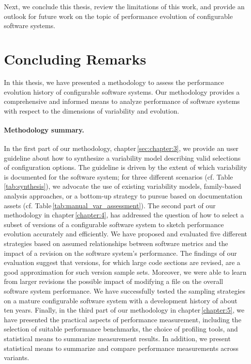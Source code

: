 Next, we conclude this thesis, review the limitations of this work, and provide
an outlook for future work on the topic of performance evolution of configurable
software systems.

\section{Concluding Remarks}
In this thesis, we have presented a methodology to assess the performance
evolution history of configurable software systems. Our methodology provides a
comprehensive and informed means to analyze performance of software systems
with respect to the dimensions of variability and evolution.

\paragraph{Methodology summary.} In the first part of our methodology,
chapter\,\ref{sec:chapter:3}, we provide an user guideline about how to
synthesize a variability model describing valid selections of configuration options. The guideline is driven by the extent of which variability is documented for the software system; for three different
scenarios (cf. Table\,\ref{tab:synthesis}), we advocate the use of existing
variability models, family-based analysis approaches, or a bottom-up strategy to pursue based on
documentation assets (cf. Table\,\ref{tab:manual_var_assessment}). 
The second part of our methodology in chapter\,\ref{chapter:4}, has
addressed the question of how to select a subset of versions of a configurable
software system to sketch performance evolution accurately and efficiently. We
have proposed and evaluated five different strategies based on assumed
relationships between software metrics and the impact of a revision on the
software system’s performance. The findings of our evaluation suggest that
versions, for which large code sections are revised, are a good approximation
for such version sample sets. Moreover, we were able to learn from larger revisions
the possible impact of modifying a file on the overall software system
performance. We have successfully tested the sampling strategies on a mature
configurable software system with a development history of about ten years.
Finally, in the third part of our methodology in chapter\,\ref{chapter:5}, we
have presented the practical aspects of performance measurement, including the selection of
suitable performance benchmarks, the choice of profiling tools, and statistical
means to summarize measurement results. In addition, we present  statistical
means to summarize and compare performance measurements across variants.

